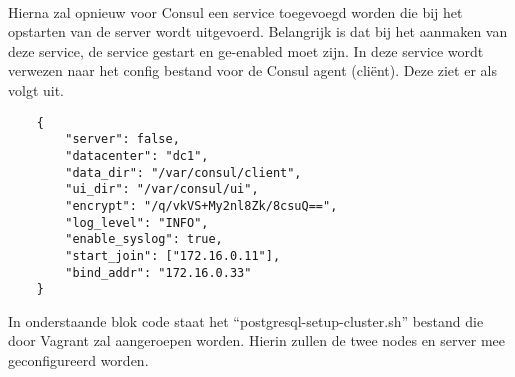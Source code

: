 \begin{lstlisting}
    
\end{lstlisting}


Hierna zal opnieuw voor Consul een service toegevoegd worden die bij het opstarten van de server wordt uitgevoerd. Belangrijk is dat bij het aanmaken van deze service, de service gestart en ge-enabled moet zijn. In deze service wordt verwezen naar het config bestand voor de Consul agent (cliënt). Deze ziet er als volgt uit.

\begin{lstlisting}
    {
        "server": false,
        "datacenter": "dc1",
        "data_dir": "/var/consul/client",
        "ui_dir": "/var/consul/ui",
        "encrypt": "/q/vkVS+My2nl8Zk/8csuQ==", 
        "log_level": "INFO",
        "enable_syslog": true,
        "start_join": ["172.16.0.11"],
        "bind_addr": "172.16.0.33"
    }
\end{lstlisting}

In onderstaande blok code staat het “postgresql-setup-cluster.sh” bestand die door Vagrant zal aangeroepen worden. Hierin zullen de twee nodes en server mee geconfigureerd worden.

